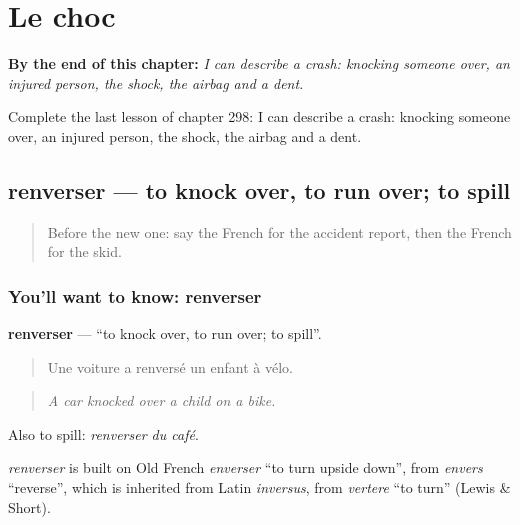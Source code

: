 
\chapter{Le choc}
\label{ch:fr-le-choc}

\begin{chapteropening}
\textbf{By the end of this chapter:} \emph{I can describe a crash: knocking someone over, an injured person, the shock, the airbag and a dent.}

Complete the last lesson of chapter 298: I can describe a crash: knocking someone over, an injured person, the shock, the airbag and a dent.
\end{chapteropening}

\section[renverser]{renverser — to knock over, to run over; to spill}

\label{lesson:FR-C298-renverser}



\begin{quote}
Before the new one: say the French for the accident report, then the French for the skid.
\end{quote}

\subsection*{You'll want to know: renverser}
\textbf{renverser} — \textquotedblleft{}to knock over, to run over; to spill\textquotedblright{}.

\begin{quote}
Une voiture a renversé un enfant à vélo.
\end{quote}

\begin{quote}
\emph{A car knocked over a child on a bike.}
\end{quote}

Also to spill: \emph{renverser du café}.

\begin{cousinweb}
\emph{renverser} is built on Old French \emph{enverser} \textquotedblleft{}to turn upside down\textquotedblright{}, from \emph{envers} \textquotedblleft{}reverse\textquotedblright{}, which is inherited from Latin \emph{inversus}, from \emph{vertere} \textquotedblleft{}to turn\textquotedblright{} (Lewis \& Short).
\end{cousinweb}

